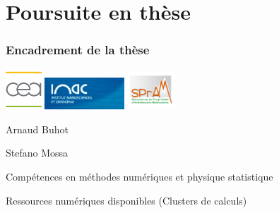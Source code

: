 \documentclass{beamer}
\begin{document}
\section{Poursuite en thèse}
\frame %
{
  \frametitle{Encadrement de la thèse}
 
 \begin{center}
 \includegraphics[height=1.5cm]{cea.jpg} \hfill \includegraphics[height=1.2cm]{inac.jpg} \hfill
\includegraphics[height=1.4cm]{spram.jpg}
 \end{center}

\begin{itemize}
\begin{center}

\item<1-> Arnaud Buhot
\item<2-> Stefano Mossa

\medskip

\item<3-> Compétences en méthodes numériques et physique statistique

\medskip
\item<4-> Ressources numériques disponibles (Clusters de calculs)


\end{center}
\end{itemize}
}
\end{document}
